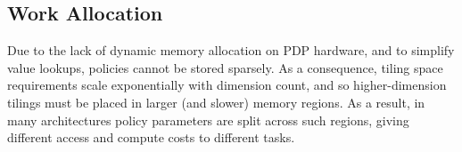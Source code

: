 
\subsection{Work Allocation}\label{sec:work-allocation}
Due to the lack of dynamic memory allocation on PDP hardware, and to simplify value lookups, policies cannot be stored sparsely.
As a consequence, tiling space requirements scale exponentially with dimension count, and so higher-dimension tilings must be placed in larger (and slower) memory regions.
As a result, in many architectures policy parameters are split across such regions, giving different access and compute costs to different tasks.

